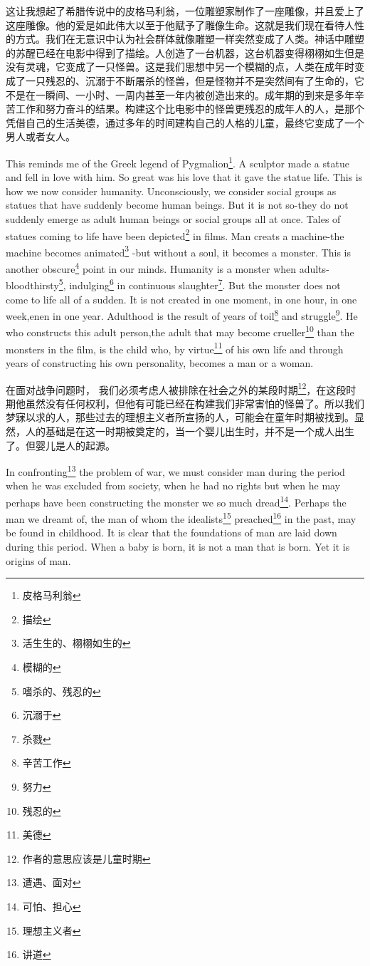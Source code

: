 \documentclass[lang=cn,10pt]{elegantbook}
\begin{document}
这让我想起了希腊传说中的皮格马利翁，一位雕塑家制作了一座雕像，并且爱上了这座雕像。他的爱是如此伟大以至于他赋予了雕像生命。这就是我们现在看待人性的方式。我们在无意识中认为社会群体就像雕塑一样突然变成了人类。神话中雕塑的苏醒已经在电影中得到了描绘。人创造了一台机器，这台机器变得栩栩如生但是没有灵魂，它变成了一只怪兽。这是我们思想中另一个模糊的点，人类在成年时变成了一只残忍的、沉溺于不断屠杀的怪兽，但是怪物并不是突然间有了生命的，它不是在一瞬间、一小时、一周内甚至一年内被创造出来的。成年期的到来是多年辛苦工作和努力奋斗的结果。构建这个比电影中的怪兽更残忍的成年人的人，是那个凭借自己的生活美德，通过多年的时间建构自己的人格的儿童，最终它变成了一个男人或者女人。

This reminds me of the Greek legend of Pygmalion\footnote{皮格马利翁}. A sculptor made a statue and fell in love with him. So great was his love that it gave the statue life. This is how we now consider humanity. Unconsciously, we consider social groups as statues that have suddenly become human beings. But it is not so-they do not suddenly emerge as adult human beings or social groups all at once. Tales of statues coming to life have been depicted\footnote{描绘} in films. Man creats a machine-the machine becomes animated\footnote{活生生的、栩栩如生的} -but without a soul, it becomes a monster. This is another obscure\footnote{模糊的} point in our minds. Humanity is a monster when adults-bloodthirsty\footnote{嗜杀的、残忍的}, indulging\footnote{沉溺于} in continuous slaughter\footnote{杀戮}. But the monster does not come to life all of a sudden. It is not created in one moment, in one hour, in one week,enen in one year. Adulthood is the result of years of toil\footnote{辛苦工作} and struggle\footnote{努力}. He who constructs this adult person,the adult that may become crueller\footnote{残忍的} than the monsters in the film, is the child who, by virtue\footnote{美德} of his own life and through years of constructing his own personality, becomes a man or a woman.

在面对战争问题时， 我们必须考虑人被排除在社会之外的某段时期\footnote{作者的意思应该是儿童时期}，在这段时期他虽然没有任何权利，但他有可能已经在构建我们非常害怕的怪兽了。所以我们梦寐以求的人，那些过去的理想主义者所宣扬的人，可能会在童年时期被找到。显然，人的基础是在这一时期被奠定的，当一个婴儿出生时，并不是一个成人出生了。但婴儿是人的起源。

In confronting\footnote{遭遇、面对} the problem of war, we must consider man during the period when he was excluded from society, when he had no rights but when he may perhaps have been constructing the monster we so much dread\footnote{可怕、担心}. Perhaps the man we dreamt of, the man of whom the idealists\footnote{理想主义者} preached\footnote{讲道} in the past, may be found in childhood. It is clear that the foundations of man are laid down during this period. When a baby is born, it is not a man that is born. Yet it is origins of man.
\end{document}
